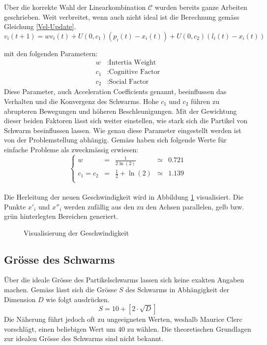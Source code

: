 Über die korrekte Wahl der Linearkombination $\mathcal{C}$ wurden bereits ganze Arbeiten geschrieben. Weit verbreitet, wenn auch nicht ideal ist die Berechnung gemäss Gleichung \ref{Vel-Update}. \\
\begin{equation}
	v_i(t+1) = w v_i(t) + U(0,c_1) (p_i(t)-x_i(t)) + U(0,c_2) (l_i(t)-x_i(t))\label{Vel-Update}
\end{equation}

mit den folgenden Parametern:
\begin{align*}
	w &: \text{Intertia Weight} \\
	c_1 &: \text{Cognitive Factor} \\
	c_2 &: \text{Social Factor}
\end{align*}
Diese Parameter, auch Acceleration Coefficients genannt, beeinflussen das  Verhalten und die Konvergenz des Schwarms. Hohe $c_1$ und $c_2$ führen zu abrupteren Bewegungen und höheren Beschleunigungen. Mit der Gewichtung dieser beiden Faktoren lässt sich weiter einstellen, wie stark sich die Partikel von Schwarm beeinflussen lassen. Wie genau diese Parameter eingestellt werden ist von der Problemstellung abhängig. Gemäss \cite{Clerc-Stagnation} haben sich folgende Werte für einfache Probleme als zweckmässig erwiesen:
\begin{equation}
	\left\lbrace \begin{array}{lllll}
		w & = & \frac{1}{2 \ln(2)} & \simeq & 0.721 \\
		c_1 = c_2 & = & \frac{1}{2} + \ln(2) & \simeq & 1.139 \\
	\end{array}	\right. 
\end{equation} \\


Die Herleitung der neuen Geschwindigkeit wird in Abbildung \ref{Fig-Visualisierung-Geschwindigkeit} visualisiert. Die Punkte $x'_i$ und $x''_i$ werden zufällig aus den zu den Achsen parallelen, gelb bzw. grün hinterlegten Bereichen generiert.  \\
\begin{figure}[htbp]
	\centering
	
	\caption{Visualisierung der Geschwindigkeit}
	\label{Fig-Visualisierung-Geschwindigkeit}
\end{figure}


\subsection{Grösse des Schwarms}
Über die ideale Grösse des Partikelschwarms lassen sich keine exakten Angaben machen. Gemäss \cite{Clerc-Standards} lässt sich die Grösse $S$ des Schwarms in Abhängigkeit der Dimension $D$ wie folgt ausdrücken.
\begin{equation}
	S = 10 + \left[ 2 \cdot \sqrt{D} \right]
\end{equation}
Die Näherung führt jedoch oft zu ungeeigneten Werten, weshalb Maurice Clerc vorschlägt, einen beliebigen Wert um $40$ zu wählen. Die theoretischen Grundlagen zur idealen Grösse des Schwarms sind nicht bekannt.


